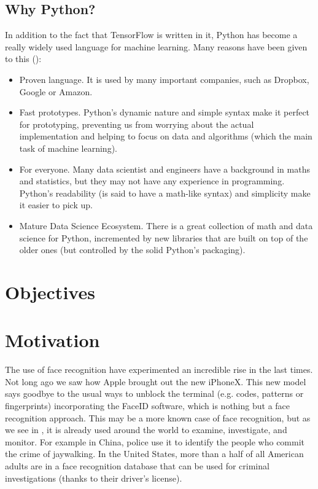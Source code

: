 	\subsection{Why Python?}
	In addition to the fact that TensorFlow is written in it, Python has become a really widely used language for machine learning. Many reasons have been given to this (\cite{why_python}):

	\begin{itemize}
		\item Proven language. It is used by many important companies, such as Dropbox, Google or Amazon. 
		\item Fast prototypes. Python's dynamic nature and simple syntax make it perfect for prototyping, preventing us from worrying about the actual implementation and helping to focus on data and algorithms (which the main task of machine learning).
		\item For everyone. Many data scientist and engineers have a background in maths and statistics, but they may not have any experience in programming. Python's readability (is said to have a math-like syntax) and simplicity make it easier to pick up.
		\item Mature Data Science Ecosystem. There is a great collection of math and data science for Python, incremented by new libraries that are built on top of the older ones (but controlled by the solid Python's packaging). 
	\end{itemize}

\section{Objectives}				%



\section{Motivation}
The use of face recognition have experimented an incredible rise in the last times. Not long ago we saw how Apple brought out the new iPhoneX. This new model says goodbye to the usual ways to unblock the terminal (e.g. codes, patterns or fingerprints) incorporating the FaceID software, which is nothing but a face recognition approach. This may be a more known case of face recognition, but as we see in \cite{iphonex_and_other_uses}, it is already used around the world to examine, investigate, and monitor. For example in China, police use it to identify the people who commit the crime of jaywalking. In the United States, more than a half of all American adults are in a face recognition database that can be used for criminal investigations (thanks to their driver’s license).





